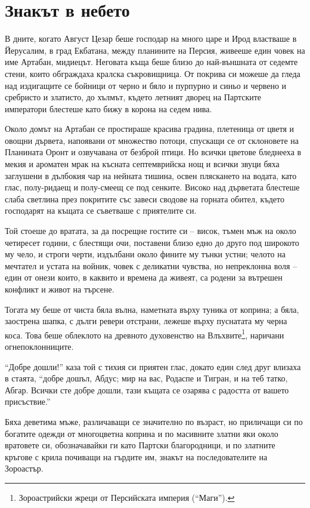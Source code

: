 \documentclass[oneside,10pt]{memoir}
\begin{document}
\newpage

\part{Знакът в небето}

В дните, когато Август Цезар беше господар на много царе и Ирод властваше в
Йерусалим, в град Екбатана, между планините на Персия, живееше един човек на име
Артабан, мидиецът. Неговата къща беше близо до най-външната от седемте стени,
които обграждаха кралска съкровищница. От покрива си можеше да гледа над
издигащите се бойници от черно и бяло и пурпурно и синьо и червено и сребристо и
златисто, до хълмът, където летният дворец на Партските императори блестеше като
бижу в корона на седем нива.

Около домът на Артабан се простираше красива градина, плетеница от цветя и
овощни дървета, напоявани от множество потоци, спускащи се от склоновете на
Планината Оронт и озвучавана от безброй птици. Но всички цветове бледнееха в
мекия и ароматен мрак на късната септемврийска нощ и всички звуци бяха заглушени
в дълбокия чар на нейната тишина, освен пляскането на водата, като глас,
полу-ридаещ и полу-смеещ се под сенките. Високо над дърветата блестеше слаба
светлина през покритите със завеси сводове на горната обител, където господарят
на къщата се съветваше с приятелите си.

Той стоеше до вратата, за да посрещне гостите си -- висок, тъмен мъж на около
четиресет години, с блестящи очи, поставени близо едно до друго под широкото му
чело, и строги черти, издълбани около фините му тънки устни; челото на мечтател
и устата на войник, човек с деликатни чувства, но непреклонна воля -- един от
онези които, в каквито и времена да живеят, са родени за вътрешен конфликт и
живот на търсене.

Тогата му беше от чиста бяла вълна, наметната върху туника от коприна; а бяла,
заострена шапка, с дълги ревери отстрани, лежеше върху пуснатата му черна коса.
Това беше облеклото на древното духовенство на Влъхвите\footnote{Зороастрийски
жреци от Персийската империя (``Маги'').}, наричани огнепоклонниците.

``Добре дошли!'' каза той с тихия си приятен глас, докато един след друг влизаха
в стаята, ``добре дошъл, Абдус; мир на вас, Родаспе и Тигран, и на теб татко,
Абгар. Всички сте добре дошли, тази къщата се озарява с радостта от вашето
присъствие.''

Бяха деветима мъже, различаващи се значително по възраст, но приличащи си по
богатите одежди от многоцветна коприна и по масивните златни яки около вратовете
си, обозначавайки ги като Партски благородници, и по златните кръгове с крила
почиващи на гърдите им, знакът на последователите на Зороастър.
\end{document}
